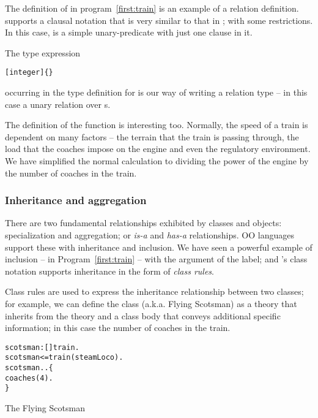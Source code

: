 The definition of  in program~\vref{first:train} is an example of a relation definition. \go supports a clausal notation that is very similar to that in \prolog; with some restrictions. In this case,  is a simple unary-predicate with just one clause in it.

The type expression
\begin{alltt}
[integer]\{\}
\end{alltt}
occurring in the type definition for  is our way of writing a relation type -- in this case a unary relation over s.

The definition of the function  is interesting too. Normally, the speed of a train is dependent on many factors -- the terrain that the train is passing through, the load that the coaches impose on the engine and even the regulatory environment. We have simplified the normal calculation to dividing the power of the engine by the number of coaches in the train.

\subsubsection{Inheritance and aggregation}
There are two fundamental relationships exhibited by classes and objects: specialization and aggregation; or \emph{is-a} and \emph{has-a} relationships. OO languages support these with inheritance and inclusion. We have seen a powerful example of inclusion -- in Program~\vref{first:train} -- with the  argument of the  label; and \go's class notation supports inheritance in the form of \emph{class rules}. 

Class rules are used to express the inheritance relationship between two classes; for example, we can define the  class (a.k.a. Flying Scotsman) as a theory that inherits from the  theory and a class body that conveys additional specific information; in this case the number of coaches in the train.

\begin{program}[tbh]
\vspace{0.5ex}
\begin{alltt}
scotsman:[]\conarrow{}train.
scotsman <= train(steamLoco).
scotsman .. \{
  coaches(4).
\}
\end{alltt}
\vspace{-2ex}
\caption{The Flying Scotsman\label{first:scotsman}}
\end{program}

